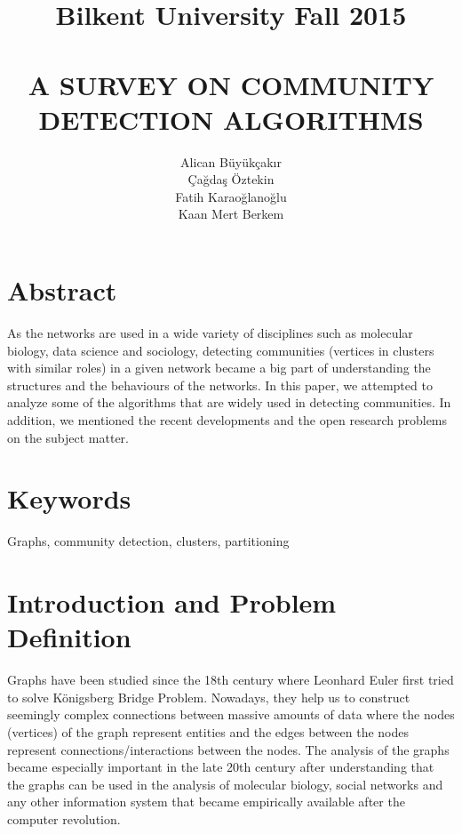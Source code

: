 \documentclass[10pt]{article}
\title{Bilkent University Fall 2015 \\ ~\\
A SURVEY ON COMMUNITY DETECTION ALGORITHMS}
\author{ %
Alican Büyükçakır \\ Çağdaş Öztekin \\
Fatih Karaoğlanoğlu \\
Kaan Mert Berkem}
\date{\vspace{-5ex}}
\begin{document}
\maketitle



\section*{Abstract}

As the networks are used in a wide variety of disciplines such as molecular biology, data science and sociology, detecting communities (vertices in clusters with similar roles) in a given network became a big part of understanding the structures and the behaviours of the networks. In this paper, we attempted to analyze some of the algorithms that are widely used in detecting communities. In addition, we mentioned the recent developments and the open research problems on the subject matter.

\section*{Keywords}

Graphs, community detection, clusters, partitioning

\newpage

\tableofcontents

\newpage

\section{Introduction and Problem Definition}

Graphs have been studied since the 18th century where Leonhard Euler first tried to solve Königsberg Bridge Problem\cite{euler}. Nowadays, they help us to construct seemingly complex connections between massive amounts of data where the nodes (vertices) of the graph represent entities and the edges between the nodes represent connections/interactions between the nodes. The analysis of the graphs became especially important in the late 20th century after understanding that the graphs can be used in the analysis of molecular biology, social networks and any other information system that became empirically available after the computer revolution.\\
\end{document}
